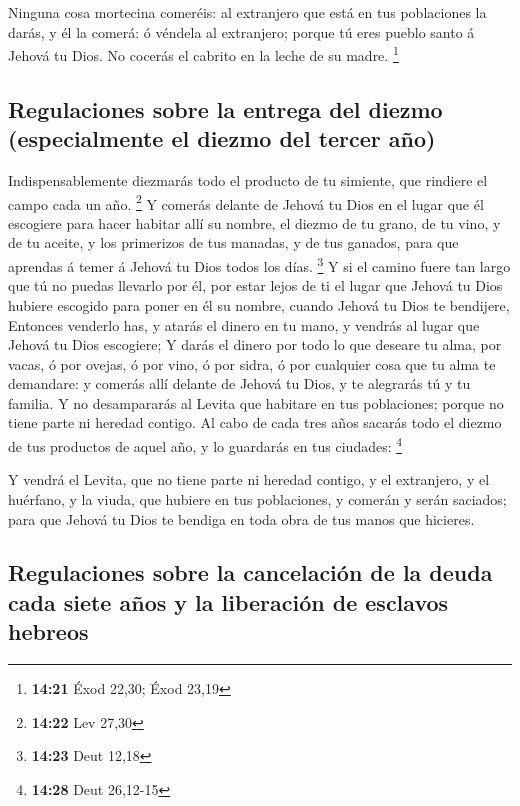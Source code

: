  Ninguna cosa mortecina comeréis: al extranjero que está en
tus poblaciones la darás, y él la comerá: ó véndela al extranjero;
porque tú eres pueblo santo á Jehová tu Dios. No cocerás el cabrito en
la leche de su madre. \footnote{\textbf{14:21} Éxod 22,30; Éxod 23,19}

\hypertarget{regulaciones-sobre-la-entrega-del-diezmo-especialmente-el-diezmo-del-tercer-auxf1o}{%
\subsection{Regulaciones sobre la entrega del diezmo (especialmente el
diezmo del tercer
año)}\label{regulaciones-sobre-la-entrega-del-diezmo-especialmente-el-diezmo-del-tercer-auxf1o}}

 Indispensablemente diezmarás todo el producto de tu
simiente, que rindiere el campo cada un año. \footnote{\textbf{14:22}
  Lev 27,30}  Y comerás delante de Jehová tu Dios en el
lugar que él escogiere para hacer habitar allí su nombre, el diezmo de
tu grano, de tu vino, y de tu aceite, y los primerizos de tus manadas, y
de tus ganados, para que aprendas á temer á Jehová tu Dios todos los
días. \footnote{\textbf{14:23} Deut 12,18}  Y si el camino
fuere tan largo que tú no puedas llevarlo por él, por estar lejos de ti
el lugar que Jehová tu Dios hubiere escogido para poner en él su nombre,
cuando Jehová tu Dios te bendijere,  Entonces venderlo has,
y atarás el dinero en tu mano, y vendrás al lugar que Jehová tu Dios
escogiere;  Y darás el dinero por todo lo que deseare tu
alma, por vacas, ó por ovejas, ó por vino, ó por sidra, ó por cualquier
cosa que tu alma te demandare: y comerás allí delante de Jehová tu Dios,
y te alegrarás tú y tu familia.  Y no desampararás al
Levita que habitare en tus poblaciones; porque no tiene parte ni heredad
contigo.  Al cabo de cada tres años sacarás todo el diezmo
de tus productos de aquel año, y lo guardarás en tus ciudades:
\footnote{\textbf{14:28} Deut 26,12-15}

 Y vendrá el Levita, que no tiene parte ni heredad contigo,
y el extranjero, y el huérfano, y la viuda, que hubiere en tus
poblaciones, y comerán y serán saciados; para que Jehová tu Dios te
bendiga en toda obra de tus manos que hicieres.

\hypertarget{regulaciones-sobre-la-cancelaciuxf3n-de-la-deuda-cada-siete-auxf1os-y-la-liberaciuxf3n-de-esclavos-hebreos}{%
\subsection{Regulaciones sobre la cancelación de la deuda cada siete
años y la liberación de esclavos
hebreos}\label{regulaciones-sobre-la-cancelaciuxf3n-de-la-deuda-cada-siete-auxf1os-y-la-liberaciuxf3n-de-esclavos-hebreos}}

